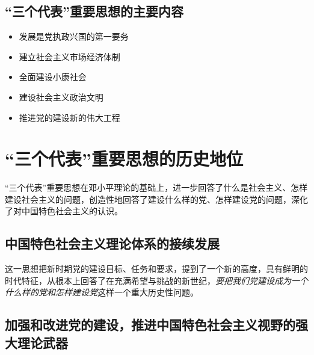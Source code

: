     \subsection{“三个代表”重要思想的主要内容}
        \begin{itemize}
            \item 发展是党执政兴国的第一要务
            \item 建立社会主义市场经济体制
            \item 全面建设小康社会
            \item 建设社会主义政治文明
            \item 推进党的建设新的伟大工程
        \end{itemize}


\section{“三个代表”重要思想的历史地位}
    “三个代表”重要思想在邓小平理论的基础上，进一步回答了什么是社会主义、怎样建设社会主义的问题，创造性地回答了建设什么样的党、怎样建设党的问题，深化了对中国特色社会主义的认识。
    \subsection{中国特色社会主义理论体系的接续发展}
        这一思想把新时期党的建设目标、任务和要求，提到了一个新的高度，具有鲜明的时代特征，从根本上回答了在充满希望与挑战的新世纪，\emph{要把我们党建设成为一个什么样的党和怎样建设党}这样一个重大历史性问题。

    \subsection{加强和改进党的建设，推进中国特色社会主义视野的强大理论武器}
